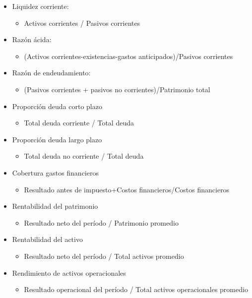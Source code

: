 {\begin{itemize}
	\item Liquidez corriente:
	  \begin{itemize}
	   \item Activos corrientes / Pasivos corrientes
	  \end{itemize}
	 \item Razón ácida:
	  \begin{itemize}
	   \item (Activos corrientes-existencias-gastos anticipados)/Pasivos corrientes
	  \end{itemize}  
	 \item Razón de endeudamiento:
	  \begin{itemize}
	   \item (Pasivos corrientes + pasivos no corrientes)/Patrimonio total
	  \end{itemize}
	 \item Proporción deuda corto plazo
	  \begin{itemize}
	   \item Total deuda corriente / Total deuda
	  \end{itemize}
	 \item Proporción deuda largo plazo
	  \begin{itemize}
	   \item Total deuda no corriente / Total deuda
	  \end{itemize}
	 \item Cobertura gastos financieros
	  \begin{itemize}
	   \item Resultado antes de impuesto+Costos financieros/Costos financieros
	  \end{itemize}
	 \item Rentabilidad del patrimonio
	  \begin{itemize}
	   \item Resultado neto del período / Patrimonio promedio
	  \end{itemize}
	 \item Rentabilidad del activo
	  \begin{itemize}
	   \item Resultado neto del período / Total activos promedio
	  \end{itemize}
	 \item Rendimiento de activos operacionales
	  \begin{itemize}
	   \item Resultado operacional del período / Total activos operacionales promedio
	  \end{itemize}

\end{itemize}}
